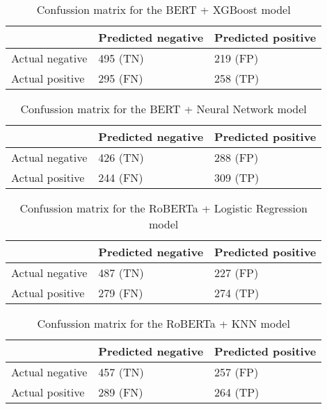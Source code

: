 \begin{table}[!htbp]
\centering
{
\makegapedcells
\begin{tabular}{lll}
                & Predicted negative & Predicted positive \\
\hline
Actual negative & 495 (TN)           & 219 (FP) \\
Actual positive & 295 (FN)           & 258 (TP) \\
\hline
\end{tabular}
}
\caption{Confussion matrix for the BERT + XGBoost model}
\label{bertxgb_cm}
\end{table}

\begin{table}[!htbp]
\centering
{
\makegapedcells
\begin{tabular}{lll}
                & Predicted negative & Predicted positive \\
\hline
Actual negative & 426 (TN)           & 288 (FP) \\
Actual positive & 244 (FN)           & 309 (TP) \\
\hline
\end{tabular}
}
\caption{Confussion matrix for the BERT + Neural Network model}
\label{bertnn_cm}
\end{table}



\begin{table}[!htbp]
\centering
{
\makegapedcells
\begin{tabular}{lll}
                & Predicted negative & Predicted positive \\
\hline
Actual negative & 487 (TN)           & 227 (FP) \\
Actual positive & 279 (FN)           & 274 (TP) \\
\hline
\end{tabular}
}
\caption{Confussion matrix for the RoBERTa + Logistic Regression model}
\label{robertalr_cm}
\end{table}

\begin{table}[!htbp]
\centering
{
\makegapedcells
\begin{tabular}{lll}
                & Predicted negative & Predicted positive \\
\hline
Actual negative & 457 (TN)           & 257 (FP) \\
Actual positive & 289 (FN)           & 264 (TP) \\
\hline
\end{tabular}
}
\caption{Confussion matrix for the RoBERTa + KNN model}
\label{robertaknn_cm}
\end{table}

